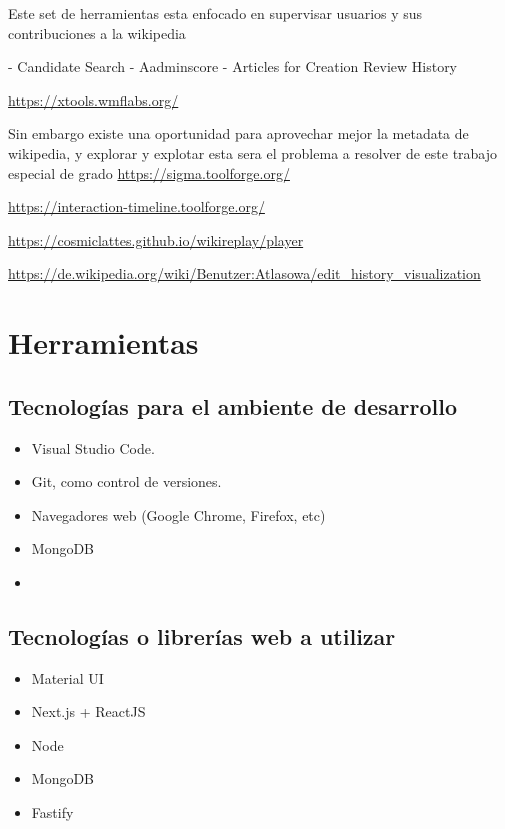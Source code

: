 Este set de herramientas esta enfocado en supervisar usuarios y sus contribuciones a la wikipedia

- Candidate Search
- Aadminscore
- Articles for Creation Review History

\url{https://xtools.wmflabs.org/}


Sin embargo existe una oportunidad para aprovechar mejor la metadata de wikipedia, y explorar y explotar esta sera el problema a resolver de este trabajo especial de grado
\url{https://sigma.toolforge.org/}


\url{https://interaction-timeline.toolforge.org/}


\url{https://cosmiclattes.github.io/wikireplay/player}


\url{https://de.wikipedia.org/wiki/Benutzer:Atlasowa/edit_history_visualization}

\section{Herramientas}

\subsection*{Tecnologías para el ambiente de desarrollo}
\begin{itemize}
    \item Visual Studio Code.
    \item Git, como control de versiones.
    \item Navegadores web (Google Chrome, Firefox, etc)
    \item MongoDB
    \item 
\end{itemize}

\subsection*{Tecnologías o librerías web a utilizar}
\begin{itemize}
    \item Material UI
    \item Next.js + ReactJS
    \item Node
    \item MongoDB
    \item Fastify
\end{itemize}

